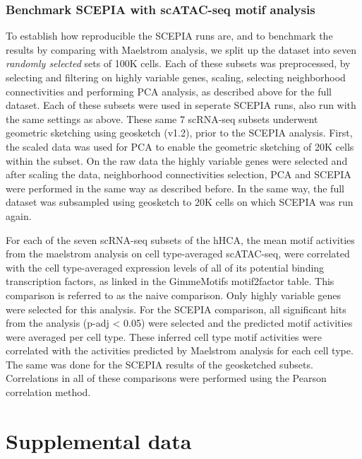\subsubsection{Benchmark SCEPIA with scATAC-seq motif analysis}

To establish how reproducible the SCEPIA runs are, and to benchmark the results by comparing with Maelstrom analysis, we split up the dataset into seven \textit{randomly selected} sets of 100K cells. Each of these subsets was preprocessed, by selecting and filtering on highly variable genes, scaling, selecting neighborhood connectivities and performing PCA analysis, as described above for the full dataset. Each of these subsets were used in seperate SCEPIA runs, also run with the same settings as above. These same 7 scRNA-seq subsets underwent geometric sketching using geosketch (v1.2), prior to the SCEPIA analysis. First, the scaled data was used for PCA to enable the geometric sketching of 20K cells within the subset. On the raw data the highly variable genes were selected and after scaling the data, neighborhood connectivities selection, PCA and SCEPIA were performed in the same way as described before. In the same way, the full dataset was subsampled using geosketch to 20K cells on which SCEPIA was run again.

For each of the seven scRNA-seq subsets of the hHCA, the mean motif activities from the maelstrom analysis on cell type-averaged scATAC-seq, were correlated with the cell type-averaged expression levels of all of its potential binding transcription factors, as linked in the GimmeMotifs motif2factor table. This comparison is referred to as the naive comparison. Only highly variable genes were selected for this analysis. For the SCEPIA comparison, all significant hits from the analysis (p-adj < 0.05) were selected and the predicted motif activities were averaged per cell type. These inferred cell type motif activities were correlated with the activities predicted by Maelstrom analysis for each cell type. The same was done for the SCEPIA results of the geosketched subsets. Correlations in all of these comparisons were performed using the Pearson correlation method.

\beginsupplement
\section{Supplemental data}

